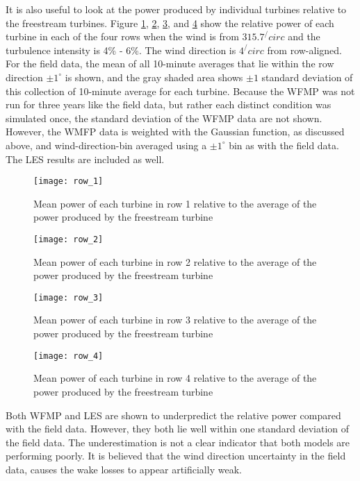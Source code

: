 \documentclass{umthesis}
\begin{document}
It is also useful to look at the power produced by individual turbines relative to the freestream turbines. Figure \ref{fig:row_1}, \ref{fig:row_2}, \ref{fig:row_3}, and \ref{fig:row_4} show the relative power of each turbine in each of the four rows when the wind is from $315.7^/circ$ and the turbulence intensity is 4\% - 6\%. The wind direction is $4^/circ$ from row-aligned. For the field data, the mean of all 10-minute averages that lie within the row direction $\pm1^\circ$ is shown, and the gray shaded area shows $\pm1$ standard deviation of this collection of 10-minute average for each turbine. Because the WFMP was not run for three years like the field data, but rather each distinct condition was simulated once, the standard deviation of the WFMP data are not shown. However, the WMFP data is weighted with the Gaussian function, as discussed above, and wind-direction-bin averaged using a $\pm1^\circ$ bin as with the field data. The LES results are included as well.

\begin{figure}
  \centering
  \texttt{[image: row\_1]}
  \caption{Mean power of each turbine in row 1 relative to the average of the power produced by the freestream turbine}\label{fig:row_1}
\end{figure}

\begin{figure}
  \centering
  \texttt{[image: row\_2]}
  \caption{Mean power of each turbine in row 2 relative to the average of the power produced by the freestream turbine}\label{fig:row_2}
\end{figure}

\begin{figure}
  \centering
  \texttt{[image: row\_3]}
  \caption{Mean power of each turbine in row 3 relative to the average of the power produced by the freestream turbine}\label{fig:row_3}
\end{figure}

\begin{figure}
  \centering
  \texttt{[image: row\_4]}
  \caption{Mean power of each turbine in row 4 relative to the average of the power produced by the freestream turbine}\label{fig:row_4}
\end{figure}

Both WFMP and LES are shown to underpredict the relative power compared with the field data. However, they both lie well within one standard deviation of the field data. The underestimation is not a clear indicator that both models are performing poorly. It is believed that the wind direction uncertainty in the field data, causes the wake losses to appear artificially weak.  
\end{document}
